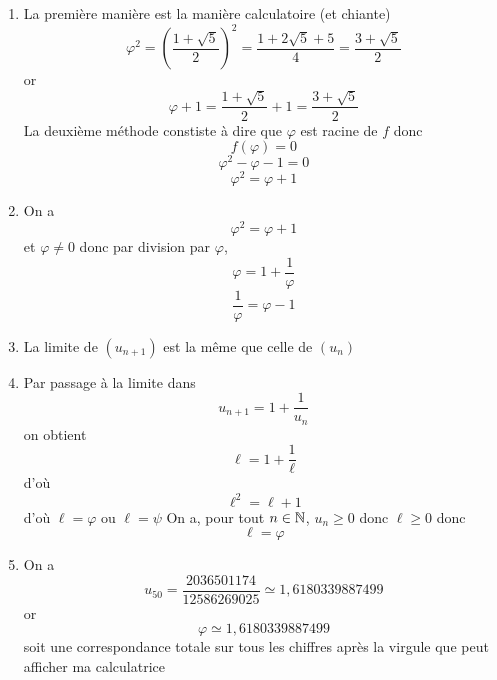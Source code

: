 \begin{enumerate}
\item La première manière est la manière calculatoire (et chiante)
$$\varphi^2 = \left(\dfrac{1+\sqrt{5}}{2}\right)^2 = \dfrac{1+2\sqrt{5}+5}{4} = \dfrac{3+\sqrt{5}}{2}$$ or $$\varphi +1 = \dfrac{1+\sqrt{5}}{2} + 1 = \dfrac{3+\sqrt{5}}{2}$$ La deuxième méthode constiste à dire que $\varphi$ est racine de $f$ donc $$f(\varphi)=0$$
$$\varphi^2-\varphi-1 = 0$$
$$\boxed{\varphi^2 = \varphi +1}$$
\item On a
$$\varphi^2 = \varphi +1$$ et $\varphi \neq 0$ donc par division par $\varphi$, 
$$\varphi = 1 + \dfrac{1}{\varphi}$$
$$\boxed{\dfrac{1}{\varphi} = \varphi -1}$$
\item La limite de $(u_{n+1})$ est la même que celle de $(u_n)$
\item Par passage à la limite dans 
$$u_{n+1} = 1 + \dfrac{1}{u_n}$$
on obtient 
$$\ell = 1 + \dfrac{1}{\ell}$$
d'où 
$$\ell^2 = \ell + 1$$
d'où $\ell = \varphi$ ou $\ell = \psi$\newline 
On a, pour tout $n\in \mathbb{N}$, $u_n \geq 0$ donc $\ell \geq 0$ donc $$\boxed{\ell = \varphi}$$
\item On a 
$$u_{50} = \dfrac{2036501174}{12586269025}\simeq 1,6180339887499$$
or 
$$\varphi \simeq 1,6180339887499$$ soit une correspondance totale sur tous les chiffres après la virgule que peut afficher ma calculatrice
\end{enumerate}
